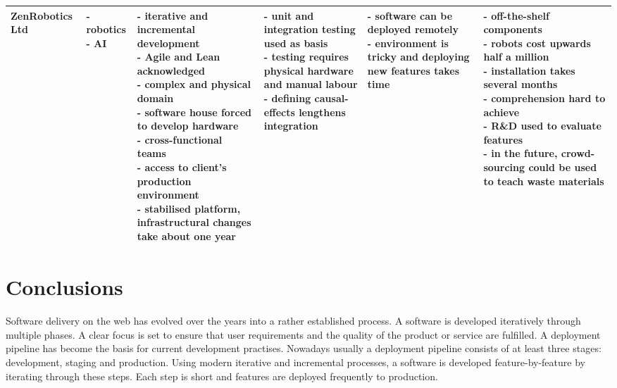 \documentclass[english]{tktltiki2}
\begin{document}
\begin{landscape}
\begin{longtable}{|p{2.5cm}|p{1.5cm}|p{4cm}|p{4cm}|p{4cm}|p{4cm}|}
        ZenRobotics Ltd &
        \parbox[t]{1.5cm}{- robotics \\
                          - AI} &
        \parbox[t]{4cm}{- iterative and incremental development \\
                        - Agile and Lean acknowledged \\
                        - complex and physical domain \\
                        - software house forced to develop hardware \\
                        - cross-functional teams \\
                        - access to client’s production environment \\
                        - stabilised platform, infrastructural changes take about one year} &
        \parbox[t]{4cm}{- unit and integration testing used as basis \\
                        - testing requires physical hardware and manual labour \\
                        - defining causal-effects lengthens integration} &
        \parbox[t]{4cm}{- software can be deployed remotely \\
                        - environment is tricky and deploying new features takes time} &
        \parbox[t]{4cm}{- off-the-shelf components \\
                        - robots cost upwards half a million \\
                        - installation takes several months \\
                        - comprehension hard to achieve \\
                        - R\&D used to evaluate features \\
                        - in the future, crowd-sourcing could be used to teach waste materials} \\

        \hline

    \end{longtable}

\end{landscape}
\restoregeometry


\section{Conclusions}

Software delivery on the web has evolved over the years into a rather established process. A software is developed iteratively through multiple phases. A clear focus is set to ensure that user requirements and the quality of the product or service are fulfilled. A deployment pipeline has become the basis for current development practises. Nowadays usually a deployment pipeline consists of at least three stages: development, staging and production. Using modern iterative and incremental processes, a software is developed feature-by-feature by iterating through these steps. Each step is short and features are deployed frequently to production.
\end{document}
